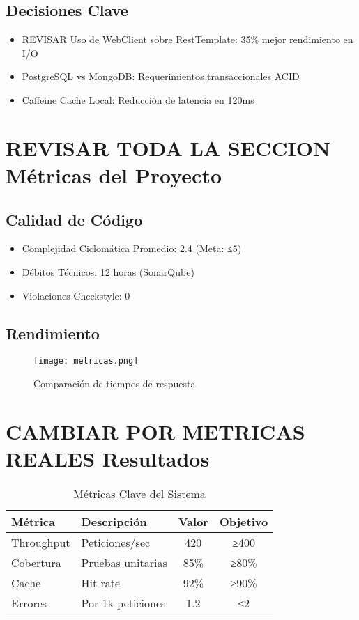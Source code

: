 \documentclass[10pt, journal]{IEEEtran}
\begin{document}
\subsection{Decisiones Clave}
\begin{itemize}
\item REVISAR Uso de WebClient sobre RestTemplate: 35\% mejor rendimiento en I/O
\item PostgreSQL vs MongoDB: Requerimientos transaccionales ACID
\item Caffeine Cache Local: Reducción de latencia en 120ms
\end{itemize}

\section{REVISAR TODA LA SECCION Métricas del Proyecto}
\subsection{Calidad de Código}
\begin{itemize}
\item Complejidad Ciclomática Promedio: 2.4 (Meta: ≤5)
\item Débitos Técnicos: 12 horas (SonarQube)
\item Violaciones Checkstyle: 0
\end{itemize}

\subsection{Rendimiento}
\begin{figure}[htbp]
\centering
\texttt{[image: metricas.png]}
\caption{Comparación de tiempos de respuesta}
\label{fig:metricas}
\end{figure}

\section{CAMBIAR POR METRICAS REALES Resultados}
\begin{table}[htbp]
\caption{Métricas Clave del Sistema}
\label{tab:metrics}
\begin{tabularx}{\columnwidth}{|l|X|c|c|}
\hline
\textbf{Métrica} & \textbf{Descripción} & \textbf{Valor} & \textbf{Objetivo} \\ \hline
Throughput & Peticiones/sec & 420 & ≥400 \\ \hline
Cobertura & Pruebas unitarias & 85\% & ≥80\% \\ \hline
Cache & Hit rate & 92\% & ≥90\% \\ \hline
Errores & Por 1k peticiones & 1.2 & ≤2 \\ \hline
\end{tabularx}
\end{table}
\end{document}
